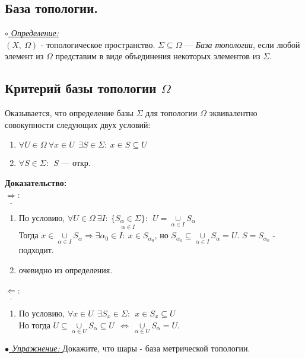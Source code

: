 \documentclass[10pt]{report}
\begin{document}
\begin{spacing}{1.5}
\section{База топологии.}
\underline{\textit{$\circ$ Определение:}}\\
$(X,~\Omega)$ - топологическое пространство.
$\Sigma\subseteq\Omega$ --- \emph{База топологии}, если любой элемент из $\Omega$ представим в виде объединения некоторых элементов из $\Sigma$.
\subsection{Критерий базы топологии $\Omega$}
Оказывается, что определение базы $\Sigma$ для топологии $\Omega$ эквивалентно совокупности следующих двух условий:
\begin{enumerate}
\item $\forall U\in\Omega~\forall x\in U~~ \exists S\in \Sigma:~x\in S\subseteq U$
\item $\forall S\in \Sigma:~~ S$ --- откр.
\end{enumerate}
\textbf{Доказательство:}\\
$\underline{\Rightarrow}$: 
\begin{enumerate}
\item По условию, $\forall U\in \Omega~\exists I:~\underset{\alpha\in I}{\lbrace S_{\alpha}\in \Sigma\rbrace}:~~U=\underset{\alpha\in I}{\cup}S_{\alpha}$
\\ Тогда $x\in \underset{\alpha\in I}{\cup}S_{\alpha}\Longrightarrow \exists\alpha_{0}\in I:~x\in S_{\alpha_{0}}$, но $S_{\alpha_{0}}\subseteq\underset{\alpha\in I}{\cup}S_{\alpha}=U$. $S = S_{\alpha_{0}}$ - подходит.
\item очевидно из определения.
\end{enumerate}
$\underline{\Leftarrow}$: \begin{enumerate}
\item[]По условию, $\forall x\in U ~~\exists S_{x}\in\Sigma:~~x\in S_{x}\subseteq U$
\\Но тогда $U\subseteq\underset{\alpha\in U}{\cup}S_{\alpha}\subseteq U~~\Longleftrightarrow~\underset{\alpha\in U}{\cup}S_{\alpha}=U$.
\end{enumerate}
 \underline{\emph{$\bullet$ Упражнение: }} Докажите, что шары - база метрической топологии.

\end{spacing}
\end{document}
